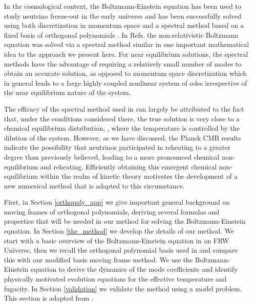In the cosmological context, the Boltzmann-Einstein equation has been used to study neutrino freeze-out in the early universe and has been successfully solved using both discretization in momentum space \cite{Hannestad:1995rs,Dolgov:1997mb,Dolgov:1998sf,Gnedin:1997vn,Mangano:2005cc} and a spectral method based on a fixed basis of orthogonal polynomials \cite{Esposito:2000hi,Mangano:2001iu}.    In Refs.\cite{Wilkening,Wilkening2} the non-relativistic Boltzmann equation was solved via a spectral method similar in  one important mathematical idea to the approach we present here.  For near equilibrium solutions, the spectral methods have the advantage of requiring a relatively small number of modes to obtain an accurate solution, as opposed to momentum space discretization which in general leads to a large highly coupled nonlinear system of odes irrespective of the near equilibrium nature of the system.  

The efficacy of the spectral method used in \cite{Esposito:2000hi,Mangano:2001iu} can largely be attributed to the fact that, under the conditions considered there, the true solution is very close to a chemical equilibrium distribution, , where the temperature is controlled by the dilution of the system. However, as we have discussed, the Planck CMB results \cite{Planck:2013pxb} indicate the possibility that neutrinos participated in reheating to a greater degree than previously believed, leading to a more pronounced chemical non-equilibrium and reheating. Efficiently obtaining this emergent chemical non-equilibrium within the realm of kinetic theory motivates the development of a new numerical method that is adapted to this  circumstance.

 First, in  Section \ref{orthopoly_app}  we give important general background on moving frames of orthogonal polynomials, deriving several formulas and properties that will be needed in our method for solving the Boltzmann-Einstein equation. In Section \ref{the_method} we develop the details of our method. We start with a basic overview of the Boltzmann-Einstein equation in an FRW Universe, then we recall the orthogonal polynomial basis used in \cite{Esposito:2000hi,Mangano:2001iu} and compare this with our modified basis moving frame method.  We use the Boltzmann-Einstein equation to derive the dynamics of the mode coefficients and identify physically motivated evolution equations for the effective temperature and fugacity.  In Section \ref{validation} we validate the method using a model problem.   This section is adapted from \cite{Birrell:2014ona,Birrell:2014gea,Birrell:2014uka}.





